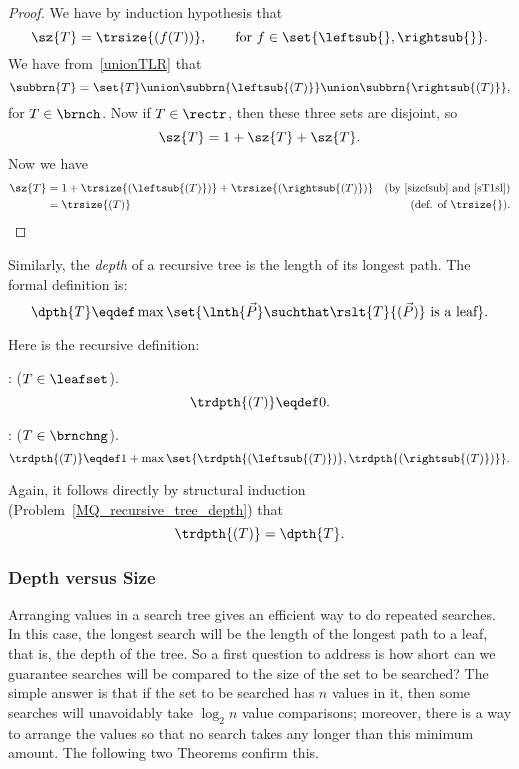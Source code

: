 \begin{definition}
\begin{lemma}
\begin{proof}
We have by induction hypothesis that
\begin{equation}\label{sizefsub}
\sz{T} = \trsize{(f(T))}, \qquad \text{for}\ f \in
\set{\leftsub{}, \rightsub{}}.
\end{equation}
We have from~\ref{unionTLR} that
\[
\subbrn{T} = \set{T} \union \subbrn{\leftsub{(T)}} \union \subbrn{\rightsub{(T)}},
\]
for $T \in \brnch$.  Now if $T \in \rectr$, then these three sets are disjoint, so
\begin{equation}\label{sT1sl}
\sz{T} = 1 + \sz{T} + \sz{T}.
\end{equation}
Now we have
\begin{align*}
\sz{T}
 & = 1 + \trsize{(\leftsub{(T)})} + \trsize{(\rightsub{(T)})}
   & \text{(by~\eqref{sizefsub} and~\eqref{sT1sl})}\\
 & = \trsize{(T)} 
   & \text{(def. of \trsize{})}.
\end{align*}
\end{proof}
\end{lemma}

Similarly, the \emph{depth}  of a recursive tree is
the length of its longest path.  The formal definition is:
\begin{equation}\label{defdepth}
\dpth{T} \eqdef \max \set{\lnth{\vec{P}} \suchthat
  \rslt{T}{(\vec{P})}\ \text{is a leaf}}.
\end{equation}

Here is the recursive definition:
\begin{definition}
: ($T \in \leafset$).
\[
\trdpth{(T)} \eqdef 0.
\]

: ($T \in\brnchng$).
\[
\trdpth{(T)} \eqdef 1+\max\set{\trdpth{(\leftsub{(T)})}, \trdpth{(\rightsub{(T)})}}.
\]
\end{definition}

Again, it follows directly by structural induction
(Problem~\ref{MQ_recursive_tree_depth}) that
\begin{equation}\label{recdepth=depth}
\trdpth{(T)} = \dpth{T}.
\end{equation}

\subsubsection{Depth versus Size}

Arranging values in a search tree gives an efficient way to do
repeated searches.  In this case, the longest search will be the
length of the longest path to a leaf, that is, the depth of the tree.
So a first question to address is how short can we guarantee searches
will be compared to the size of the set to be searched?  The simple
answer is that if the set to be searched has $n$ values in it, then
some searches will unavoidably take $\log_2 n$ value comparisons;
moreover, there is a way to arrange the values so that no search takes
any longer than this minimum amount.  The following two Theorems
confirm this.


\end{definition}
